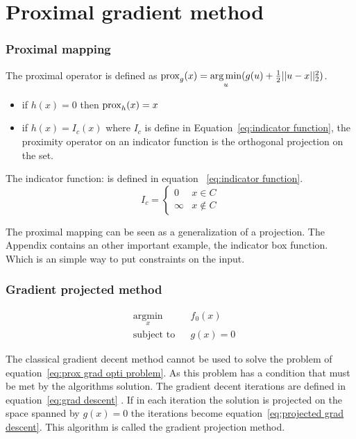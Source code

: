 \chapter{Proximal gradient method}
	\subsection{Proximal mapping}
		The proximal operator is defined as $\operatorname{prox}_g(x)= \underset{u}{\operatorname*{arg\,min}}(g(u) + \frac{1}{2}||u-x||^2_2)$. 
		
		\begin{itemize}
			\item if $h(x)=0$ then $\operatorname{prox}_h(x)=x$ 
			\item if $h(x)=I_c(x)$ where $I_c$ is define in Equation~\ref{eq:indicator function}, the proximity operator on an indicator function is the orthogonal projection on the set.
		\end{itemize}
		
		The indicator function: is defined in equation ~\ref{eq:indicator function}.
		\begin{equation}
			I_c = 
			\begin{cases}
			0 & x \in C  \\
			\infty & x \notin C
			\end{cases}
			\label{eq:indicator function}
		\end{equation}
		
		The proximal mapping can be seen as a generalization of a projection. The Appendix contains an other important example, the indicator box function. Which is an simple way to put constraints on the input.
	
	\subsection{Gradient projected method}
		
		\begin{equation}
			\begin{aligned}
			& \underset{x}{\text{argmin}}
			& & f_0(x) \\
			& \text{subject to}
			& & g(x)=0
			\end{aligned}
			\label{eq:prox grad opti problem}
		\end{equation}
		
		The classical gradient decent method cannot be used to solve the problem of equation~\ref{eq:prox grad opti problem}. As this problem has a condition that must be met by the algorithms solution. The gradient decent iterations are defined in equation~\ref{eq:grad descent} . If in each iteration the solution is projected on the space spanned by $g(x)=0$ the iterations become equation~\ref{eq:projected grad descent}. This algorithm is called the gradient projection method.
		
